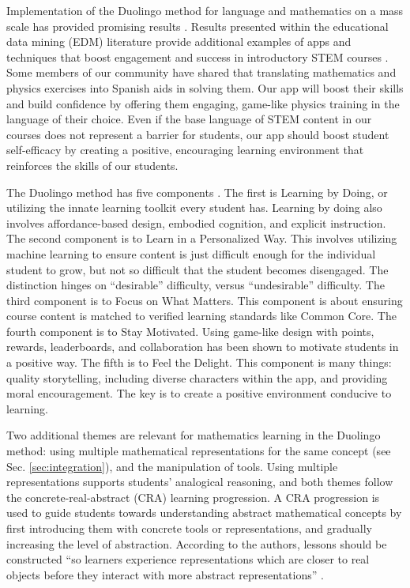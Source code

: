 \documentclass[11pt]{amsart}
\begin{document}
Implementation of the Duolingo method for language and mathematics on a mass scale has provided promising results \cite{duolingo_whitepaper}.  Results presented within the educational data mining (EDM) literature provide additional examples of apps and techniques that boost engagement and success in introductory STEM courses \cite{edm1,edm2,edm3,edm4}.  Some members of our community have shared that translating mathematics and physics exercises into Spanish aids in solving them.  Our app will boost their skills and build confidence by offering them engaging, game-like physics training in the language of their choice.  Even if the base language of STEM content in our courses does not represent a barrier for students, our app should boost student self-efficacy by creating a positive, encouraging learning environment that reinforces the skills of our students.

The Duolingo method has five components \cite{duolingo_whitepaper}.  The first is Learning by Doing, or utilizing the innate learning toolkit every student has.  Learning by doing also involves affordance-based design, embodied cognition, and explicit instruction.  The second component is to Learn in a Personalized Way.  This involves utilizing machine learning to ensure content is just difficult enough for the individual student to grow, but not so difficult that the student becomes disengaged.  The distinction hinges on ``desirable'' difficulty, versus ``undesirable'' difficulty.  The third component is to Focus on What Matters.  This component is about ensuring course content is matched to verified learning standards like Common Core.  The fourth component is to Stay Motivated.  Using game-like design with points, rewards, leaderboards, and collaboration has been shown to motivate students in a positive way.  The fifth is to Feel the Delight. This component is many things: quality storytelling, including diverse characters within the app, and providing moral encouragement.  The key is to create a positive environment conducive to learning.  

Two additional themes are relevant for mathematics learning in the Duolingo method: using multiple mathematical representations for the same concept (see Sec. \ref{sec:integration}), and the manipulation of tools.  Using multiple representations supports students' analogical reasoning, and both themes follow the concrete-real-abstract (CRA) learning progression.  A CRA progression is used to guide students towards understanding abstract mathematical concepts by first introducing them with concrete tools or representations, and gradually increasing the level of abstraction.  According to the authors, lessons should be constructed ``so learners experience representations which are closer to real objects before they interact with more abstract representations'' \cite{duolingo_whitepaper}.
\end{document}
